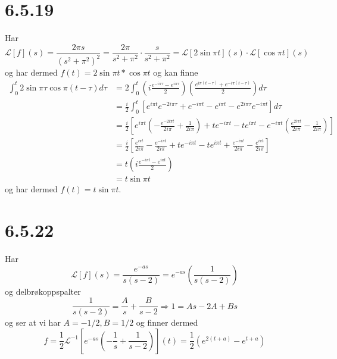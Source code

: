 \documentclass{report}
\newcommand{\nbrack}[1]{\left( #1 \right)}
\newcommand{\bbrack}[1]{\left[ #1 \right]}
\newcommand{\Lplc}[1]{\mathscr{L}\bbrack{ #1 } (s)}
\newcommand{\iLplc}[1]{\mathscr{L}^{-1}\bbrack{ #1 } (t)}
\begin{document}
\section*{6.5.19}
Har
\begin{equation}
  \label{eq:20}
  \Lplc{f} = \frac{2\pi s}{\nbrack{s^{2} + \pi^{2}}^{2}} = \frac{2\pi}{s^{2}+\pi^{2}}\cdot \frac{s}{s^{2} + \pi^{2}} = \Lplc{2\sin \pi t}\cdot \Lplc{\cos\pi t}
\end{equation}
og har dermed $f(t) = 2\sin\pi t * \cos \pi t$ og kan finne
\begin{equation}
  \label{eq:27}
  \begin{split}
    \int_{0}^{t} 2\sin\pi \tau \cos \pi (t-\tau) d\tau &= 2\int_{0}^{t} \nbrack{i\frac{e^{-i\pi\tau}-e^{i\pi\tau}}{2}} \nbrack{\frac{e^{i\pi(t-\tau)}+e^{-i\pi(t-\tau)}}{2}} d\tau \\
    &= \frac{i}{2} \int_{0}^{t} \bbrack{ e^{i\pi t}e^{-2i\pi\tau} + e^{-i\pi t} - e^{i\pi t} - e^{2i\pi \tau}e^{-i\pi t} } d\tau \\
    &= \frac{i}{2} \bbrack{ e^{i\pi t} \nbrack{ -\frac{e^{-2i\pi t}}{2i\pi} + \frac{1}{2i\pi} } + te^{-i\pi t} - te^{i\pi t} - e^{-i\pi t} \nbrack{ \frac{e^{2i\pi t}}{2i\pi} - \frac{1}{2i\pi} }  } \\
    &= \frac{i}{2} \bbrack{ \frac{e^{i\pi t}}{2i\pi} - \frac{e^{-i\pi t}}{2i\pi} + te^{-i\pi t} - te^{i\pi t} + \frac{e^{-i\pi t} }{2i\pi} - \frac{e^{i\pi t}}{2i\pi} } \\
    &= t \nbrack{ i\frac{e^{-i\pi t} - e^{i\pi t}}{2} } \\
    &= t \sin \pi t
  \end{split}
\end{equation}
og har dermed $f(t) = t\sin \pi t$.



\section*{6.5.22}
Har
\begin{equation}
  \label{eq:23}
  \Lplc{f} = \frac{e^{-as}}{s(s-2)} = e^{-as}\nbrack{ \frac{1}{s(s-2)} }
\end{equation}
og delbrøkoppspalter
\begin{equation}
  \label{eq:24}
  \frac{1}{s(s-2)} = \frac{A}{s} + \frac{B}{s-2} \Rightarrow 1 = As - 2A + Bs
\end{equation}
og ser at vi har $A = -1/2, B = 1/2$ og finner dermed
\begin{equation}
  \label{eq:25}
  f = \frac{1}{2} \iLplc{e^{-as} \nbrack{ -\frac{1}{s} + \frac{1}{s-2}}} = \frac{1}{2} \nbrack{ e^{2(t+a)} - e^{t+a} }
\end{equation}
\end{document}
